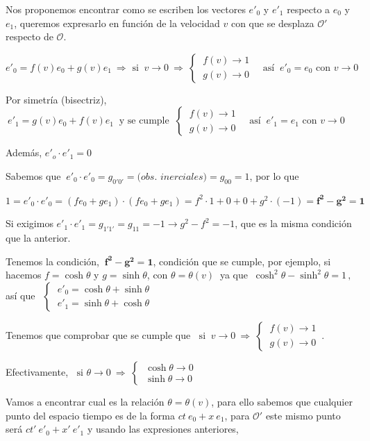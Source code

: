 Nos proponemos encontrar como se escriben los vectores $e'_0$ y  $e'_1$ respecto a  $e_0$ y  $e_1$, queremos expresarlo en función de la velocidad $v$ con que se desplaza $\mathcal O'$ respecto de $\mathcal O$.
	
$e'_0=f(v)e_0+g(v)e_1 \ \Rightarrow \text{ si } \ v \to 0 \ \Rightarrow \ \begin{cases}
 \ f(v)\to 1 \\ \ g(v) \to 0	 \end{cases} \quad \text{así } \ e'_0=e_0 \text{ con } v \to  0$ 
 
 Por simetría (bisectriz), $\ e'_1=g(v)e_0+f(v)e_1 \ \text{ y se cumple } \ 
\begin{cases}
 \ f(v)\to 1 \\ \ g(v) \to 0	 \end{cases} \quad \text{así } \ e'_1=e_1 \text{ con } v \to  0$	
 
 Además, $e'_o \cdot e'_1=0$
 
 Sabemos que $\ e'_0\cdot e'_0=g_{0'0'}=\textit{(obs. inerciales)}=g_{00}=1$, por lo que
 
 $1= e'_0\cdot e'_0=(fe_0+ge_1)\cdot (fe_0+ge_1)=f^2\cdot 1 + 0 + 0 + g^2 \cdot (-1)=\boldsymbol{ f^2-g^2=1}$
 
 Si exigimos $e'_1\cdot e'_1=g_{1'1'}=g_{11}=-1 \to g^2-f^2=-1$, que es la misma condición que la anterior.
 
 Tenemos la condición, $\ \boldsymbol{ f^2-g^2=1}$, condición que se cumple, por ejemplo, si hacemos $f=\cosh \theta$ y $g=\sinh \theta$, con $\theta=\theta(v)\ $ ya que $\ \cosh^2 \theta - \sinh^2 \theta=1\, , \ $ así que
$\ \ \begin{cases} \ e'_0=\cosh \theta + \sinh \theta \\ \ e'_1=\sinh \theta + \cosh \theta \end{cases}$
	
Tenemos que comprobar que se cumple que 	$\ \text{ si } \ v \to 0 \ \Rightarrow \ \begin{cases}
 \ f(v)\to 1 \\ \ g(v) \to 0	 \end{cases} \, . \ $ 
 
 Efectivamente, $ \ \text{ si } \theta \to 0 \ \Rightarrow \ \begin{cases} \ \cosh \theta \to 0 \\ \ \sinh \theta \to 0 \end{cases}$
 
 Vamos a encontrar cual es la relación $\theta=\theta(v)$, para ello sabemos que cualquier punto del espacio tiempo es de la forma $ct \ e_0+x\ e_1$, para $\mathcal O'$ este mismo punto será $ct' \ e'_0+x'\ e'_1$ y usando las expresiones anteriores,
 
